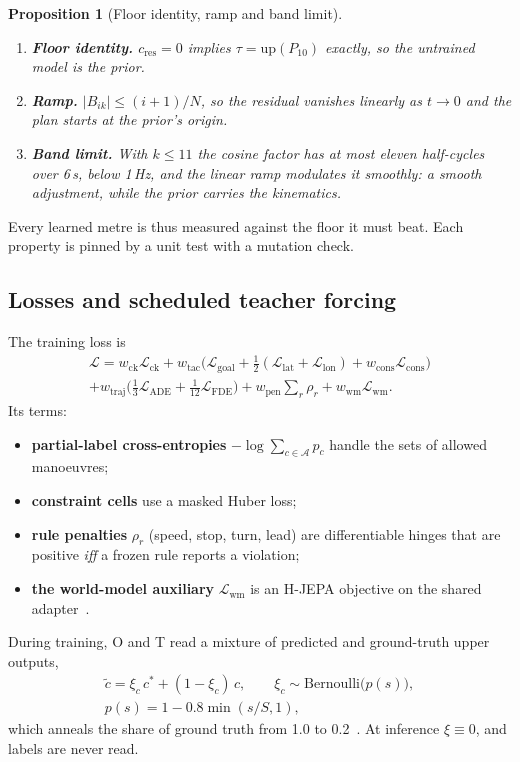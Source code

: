 \documentclass[10pt,twocolumn]{article}
\newtheorem{proposition}{Proposition}
\theoremstyle{remark}
\newcommand{\ADE}{\mathrm{ADE}}
\begin{document}
\begin{proposition}[Floor identity, ramp and band limit]\hfill
\begin{enumerate}[label=(\alph*)]
  \item \textbf{Floor identity.} $c_{\mathrm{res}}=0$ implies $\tau=\mathrm{up}(P_{10})$ exactly, so the untrained model \emph{is} the prior.
  \item \textbf{Ramp.} $|B_{ik}|\le(i+1)/N$, so the residual vanishes linearly as $t\to0$ and the plan starts at the prior's origin.
  \item \textbf{Band limit.} With $k\le11$ the cosine factor has at most eleven half-cycles over 6\,s, below 1\,Hz, and the linear ramp
        modulates it smoothly: a smooth adjustment, while the prior carries the kinematics.
\end{enumerate}
\end{proposition}
Every learned metre is thus measured against the floor it must beat. Each property is pinned by a unit test with a mutation check.

\subsection{Losses and scheduled teacher forcing}
The training loss is
\begin{multline}
\mathcal L=w_{\mathrm{ck}}\mathcal L_{\mathrm{ck}}+w_{\mathrm{tac}}\big(\mathcal L_{\mathrm{goal}}+\tfrac12(\mathcal L_{\mathrm{lat}}+\mathcal L_{\mathrm{lon}})+w_{\mathrm{cons}}\mathcal L_{\mathrm{cons}}\big)\\
+w_{\mathrm{traj}}\big(\tfrac13\mathcal L_{\ADE}+\tfrac1{12}\mathcal L_{\mathrm{FDE}}\big)+w_{\mathrm{pen}}\textstyle\sum_r\rho_r+w_{\mathrm{wm}}\mathcal L_{\mathrm{wm}}.
\end{multline}
Its terms:
\begin{itemize}
  \item \textbf{partial-label cross-entropies} $-\log\sum_{c\in\mathcal A}p_c$ handle the sets of allowed manoeuvres;
  \item \textbf{constraint cells} use a masked Huber loss;
  \item \textbf{rule penalties} $\rho_r$ (speed, stop, turn, lead) are differentiable hinges that are positive \emph{iff} a frozen rule reports a
        violation;
  \item \textbf{the world-model auxiliary} $\mathcal L_{\mathrm{wm}}$ is an H-JEPA objective on the shared adapter~\cite{hjepa}.
\end{itemize}
During training, O and T read a mixture of predicted and ground-truth upper outputs,
\begin{equation}
\begin{gathered}
\tilde c=\xi_c\,c^\ast+(1-\xi_c)\,\hat c,\qquad \xi_c\sim\mathrm{Bernoulli}\big(p(s)\big),\\
p(s)=1-0.8\min(s/S,1),
\end{gathered}
\end{equation}
which anneals the share of ground truth from 1.0 to 0.2~\cite{schedsamp}. At inference $\xi\equiv0$, and labels are never read.
\end{document}
